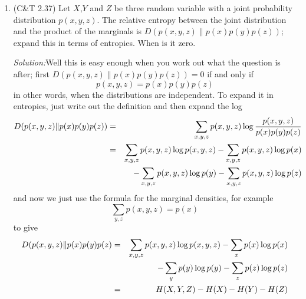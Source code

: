 \documentclass[12pt]{article}
\newcommand{\soln}{\noindent\textit{Solution:}}
\begin{document}
\begin{enumerate}
\soln So, by straightforward calculation
\begin{equation}
H(p)=\frac{1}{2}\log{2}+\frac{1}{2}\log{4}=\frac{3}{2}
\end{equation}
and
\begin{equation}
H(q)=\log{3}
\end{equation}
Next, 
\begin{equation}
D(p\|q)=\sum{x\in{\cal X}}p(x)\log{p(x)}{q(x)}
\end{equation}
so
\begin{equation}
D(p\|q)=\frac{1}{2}\log{\frac{3}{2}}+\frac{1}{2}\log{\frac{3}{4}}=\log{3}-\frac{3}{2}=.08496
\end{equation}
whereas
\begin{equation}
D(q\|p)=\frac{1}{3}\log{\frac{2}{3}}+\frac{2}{3}\log{\frac{4}{3}}=\frac{5}{3}-\log{3}=.08170
\end{equation}
so, although they have very similar values, the two KL divergences are different.

An example of a distribution with distinct $p$ and $q$ where the divergence is symmetric, try one distribution for two symbols with $p(0)=p$ and $p(1)=1-p$ and, conversely, the other with $q(0)=1-p$ and $q(1)=p$, hence
\begin{equation}
D(p\|q)=p\log{\frac{p}{1-p}}+(1-p)\log{\frac{1-p}{p}}
\end{equation}
and
\begin{equation}
D(q\|p)=(1-p)\log{\frac{1-p}{p}}+p\log{\frac{p}{1-p}}
\end{equation}
which is the same.


\item (C\&T 2.37) Let $X$,$Y$ and $Z$ be three random variable with a joint probability distribution $p(x,y,z)$. The relative entropy between the joint distribution and the product of the marginals is $D(p(x,y,z)\|p(x)p(y)p(z))$; expand this in terms of entropies. When is it zero.


\soln Well this is easy enough when you work out what the question is after; first $D(p(x,y,z)\|p(x)p(y)p(z))=0$ if and only if 
\begin{equation}
p(x,y,z)=p(x)p(y)p(z)
\end{equation}
in other words, when the distributions are independent. To expand it in entropies, just write out the definition and then expand the log
\begin{eqnarray}
D(p(x,y,z)\|p(x)p(y)p(z))&=&\sum_{x,y,z}p(x,y,z)\log{\frac{p(x,y,z)}{p(x)p(y)p(z)}}\cr
&=&\sum_{x,y,z}p(x,y,z)\log{p(x,y,z)}-\sum_{x,y,z}p(x,y,z)\log{p(x)}\cr&&-\sum_{x,y,z}p(x,y,z)\log{p(y)}-\sum_{x,y,z}p(x,y,z)\log{p(z)}
\end{eqnarray}
and now we just use the formula for the marginal densities, for example
\begin{equation}
\sum_{y,z}p(x,y,z)=p(x)
\end{equation}
to give
\begin{eqnarray}
D(p(x,y,z)\|p(x)p(y)p(z)&=&\sum_{x,y,z}p(x,y,z)\log{p(x,y,z)}-\sum_{x}p(x)\log{p(x)}\cr&&-\sum_{y}p(y)\log{p(y)}-\sum_{z}p(z)\log{p(z)}\cr
&=&H(X,Y,Z)-H(X)-H(Y)-H(Z)
\end{eqnarray}


\end{enumerate}
\end{document}
